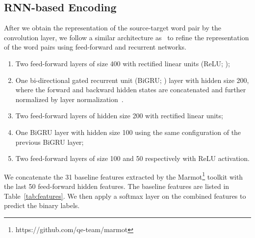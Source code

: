 \documentclass[11pt,a4paper]{article}
\newcommand{\jh}[1]{\textcolor{green}{\bf\small [#1 --JH]}}
\begin{document}
\subsection{RNN-based Encoding}
After we obtain the representation of the source-target word pair by the convolution layer, we follow a similar architecture as~\cite{TACL1113} to refine the representation of the word pairs using feed-forward and recurrent networks.
\begin{enumerate}
\item Two feed-forward layers of size 400 with rectified linear units (ReLU; \citet{nair2010rectified});
\item One bi-directional gated recurrent unit (BiGRU; \citet{cho-EtAl:2014:EMNLP2014}) layer with hidden size 200, where the forward and backward hidden states are concatenated and further normalized by layer normalization~\cite{ba2016layer}.
\item Two feed-forward layers of hidden size 200 with rectified linear units;
\item One BiGRU layer with hidden size 100 using the same configuration of the previous BiGRU layer;
\item Two feed-forward layers of size 100 and 50 respectively with ReLU activation.
\end{enumerate}
We concatenate the 31 baseline features extracted by the Marmot\footnote{https://github.com/qe-team/marmot} toolkit with the last 50 feed-forward hidden features. The baseline features are listed in Table~\ref{tab:features}.  We then apply a softmax layer on the combined features to predict the binary labels.
\end{document}
